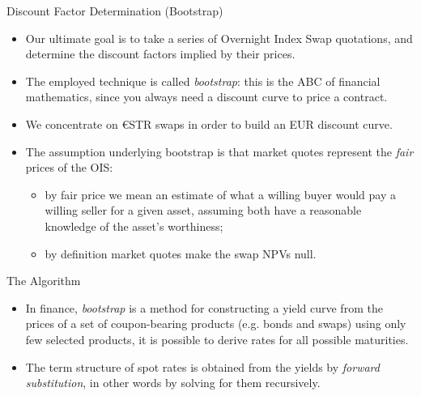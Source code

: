 \documentclass{beamer}
\begin{document}
%        
% 
% 
%
%
%
%
%

\begin{frame}{Discount Factor Determination (Bootstrap)}
\begin{itemize}
\item Our ultimate goal is to take a series of Overnight Index Swap quotations, and determine the discount factors implied by their prices. 
\item The employed technique is called \emph{bootstrap}: this is the ABC of financial mathematics, since you always need a discount curve to price a contract.
\item We concentrate on €STR swaps in order to build an EUR discount curve.
\item The assumption underlying bootstrap is that market quotes represent the \emph{fair} prices of the OIS:
\begin{itemize}
  \item by fair price we mean an estimate of what a willing buyer would pay a willing seller for a given asset, assuming both have a reasonable knowledge of the asset's worthiness;
  \item by definition market quotes make the swap NPVs null.
  \end{itemize}
  \end{itemize}
\end{frame}  
  
\begin{frame}{The Algorithm}
\begin{itemize} 
\item In finance, \emph{bootstrap} is a method for constructing a yield curve from the prices of a set of coupon-bearing products (e.g. bonds and swaps) using only few selected products, it is possible to derive rates for all possible maturities.
\item The term structure of spot rates is obtained from the yields by \emph{forward substitution}, in other words by solving for them recursively. 
\end{itemize}
\end{frame} 
\end{document}
